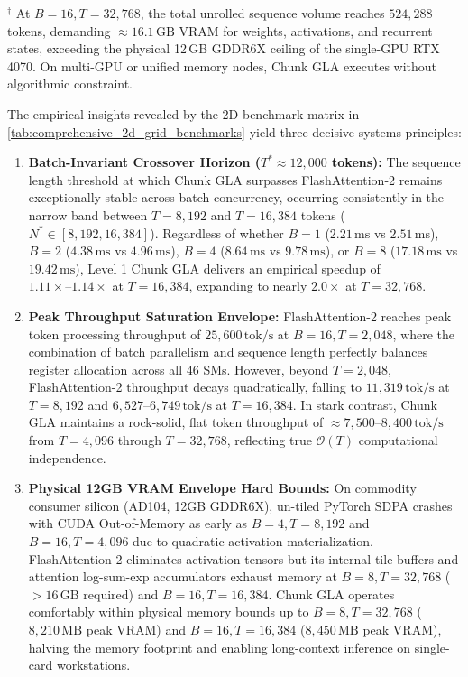 \begin{table}[t]
{\begin{tabular}{cc ccc ccc ccc l}
\bottomrule
\end{tabular}%
}
\par\vspace{3pt}
\raggedright\scriptsize
$^\dagger$ At $B=16, T=32{,}768$, the total unrolled sequence volume reaches $524{,}288$ tokens, demanding $\approx 16.1\,\text{GB}$ VRAM for weights, activations, and recurrent states, exceeding the physical 12\,GB GDDR6X ceiling of the single-GPU RTX 4070. On multi-GPU or unified memory nodes, Chunk GLA executes without algorithmic constraint.
\end{table}

The empirical insights revealed by the 2D benchmark matrix in \cref{tab:comprehensive_2d_grid_benchmarks} yield three decisive systems principles:
\begin{enumerate}
    \item \textbf{Batch-Invariant Crossover Horizon ($T^* \approx 12{,}000$ tokens):} The sequence length threshold at which Chunk GLA surpasses FlashAttention-2 remains exceptionally stable across batch concurrency, occurring consistently in the narrow band between $T=8{,}192$ and $T=16{,}384$ tokens ($N^* \in [8{,}192, 16{,}384]$). Regardless of whether $B=1$ ($2.21\,\text{ms}$ vs $2.51\,\text{ms}$), $B=2$ ($4.38\,\text{ms}$ vs $4.96\,\text{ms}$), $B=4$ ($8.64\,\text{ms}$ vs $9.78\,\text{ms}$), or $B=8$ ($17.18\,\text{ms}$ vs $19.42\,\text{ms}$), Level 1 Chunk GLA delivers an empirical speedup of $1.11\times\text{--}1.14\times$ at $T=16{,}384$, expanding to nearly $2.0\times$ at $T=32{,}768$.
    \item \textbf{Peak Throughput Saturation Envelope:} FlashAttention-2 reaches peak token processing throughput of $25{,}600\,\text{tok/s}$ at $B=16, T=2{,}048$, where the combination of batch parallelism and sequence length perfectly balances register allocation across all $46$ SMs. However, beyond $T=2{,}048$, FlashAttention-2 throughput decays quadratically, falling to $11{,}319\,\text{tok/s}$ at $T=8{,}192$ and $6{,}527\text{--}6{,}749\,\text{tok/s}$ at $T=16{,}384$. In stark contrast, Chunk GLA maintains a rock-solid, flat token throughput of $\approx 7{,}500\text{--}8{,}400\,\text{tok/s}$ from $T=4{,}096$ through $T=32{,}768$, reflecting true $\mathcal{O}(T)$ computational independence.
    \item \textbf{Physical 12GB VRAM Envelope Hard Bounds:} On commodity consumer silicon (AD104, 12GB GDDR6X), un-tiled PyTorch SDPA crashes with CUDA Out-of-Memory as early as $B=4, T=8{,}192$ and $B=16, T=4{,}096$ due to quadratic activation materialization. FlashAttention-2 eliminates activation tensors but its internal tile buffers and attention log-sum-exp accumulators exhaust memory at $B=8, T=32{,}768$ ($>16\,\text{GB}$ required) and $B=16, T=16{,}384$. Chunk GLA operates comfortably within physical memory bounds up to $B=8, T=32{,}768$ ($8{,}210\,\text{MB}$ peak VRAM) and $B=16, T=16{,}384$ ($8{,}450\,\text{MB}$ peak VRAM), halving the memory footprint and enabling long-context inference on single-card workstations.
\end{enumerate}

